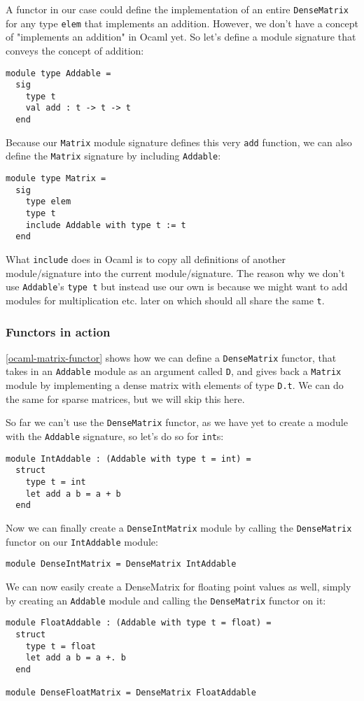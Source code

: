 A functor in our case could define the implementation of an entire \verb|DenseMatrix| for any type \verb|elem| that implements an addition. However, we don't have a concept of "implements an addition" in Ocaml yet. So let's define a module signature that conveys the concept of addition:
\begin{verbatim}
module type Addable =
  sig
    type t
    val add : t -> t -> t
  end
\end{verbatim}
Because our \verb|Matrix| module signature defines this very \verb|add| function, we can also define the \verb|Matrix| signature by including \verb|Addable|:
\begin{verbatim}
module type Matrix =
  sig
    type elem
    type t
    include Addable with type t := t
  end
\end{verbatim}
What \verb|include| does in Ocaml is to copy all definitions of another module/signature into the current module/signature. The reason why we don't use \verb|Addable|'s \verb|type t| but instead use our own is because we might want to add modules for multiplication etc. later on which should all share the same \verb|t|.

\subsubsection{Functors in action}

\autoref{ocaml-matrix-functor} shows how we can define a \verb|DenseMatrix| functor, that takes in an \verb|Addable| module as an argument called \verb|D|, and gives back a \verb|Matrix| module by implementing a dense matrix with elements of type \verb|D.t|. We can do the same for sparse matrices, but we will skip this here.

So far we can't use the \verb|DenseMatrix| functor, as we have yet to create a module with the \verb|Addable| signature, so let's do so for \verb|int|s:
\begin{verbatim}
module IntAddable : (Addable with type t = int) =
  struct
    type t = int
    let add a b = a + b
  end
\end{verbatim}

Now we can finally create a \verb|DenseIntMatrix| module by calling the \verb|DenseMatrix| functor on our \verb|IntAddable| module:
\begin{verbatim}
module DenseIntMatrix = DenseMatrix IntAddable
\end{verbatim}

We can now easily create a DenseMatrix for floating point values as well, simply by creating an \verb|Addable| module and calling the \verb|DenseMatrix| functor on it:
\begin{verbatim}
module FloatAddable : (Addable with type t = float) =
  struct
    type t = float
    let add a b = a +. b
  end

module DenseFloatMatrix = DenseMatrix FloatAddable
\end{verbatim}
